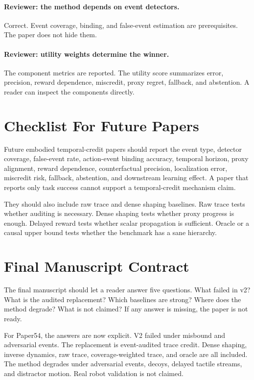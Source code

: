 \documentclass{article}
\begin{document}
\paragraph{Reviewer: the method depends on event detectors.}
Correct. Event coverage, binding, and false-event estimation are prerequisites. The paper does not hide them.

\paragraph{Reviewer: utility weights determine the winner.}
The component metrics are reported. The utility score summarizes error, precision, reward dependence, miscredit, proxy regret, fallback, and abstention. A reader can inspect the components directly.

\section{Checklist For Future Papers}

Future embodied temporal-credit papers should report the event type, detector coverage, false-event rate, action-event binding accuracy, temporal horizon, proxy alignment, reward dependence, counterfactual precision, localization error, miscredit risk, fallback, abstention, and downstream learning effect. A paper that reports only task success cannot support a temporal-credit mechanism claim.

They should also include raw trace and dense shaping baselines. Raw trace tests whether auditing is necessary. Dense shaping tests whether proxy progress is enough. Delayed reward tests whether scalar propagation is sufficient. Oracle or a causal upper bound tests whether the benchmark has a sane hierarchy.

\section{Final Manuscript Contract}

The final manuscript should let a reader answer five questions. What failed in v2? What is the audited replacement? Which baselines are strong? Where does the method degrade? What is not claimed? If any answer is missing, the paper is not ready.

For Paper54, the answers are now explicit. V2 failed under misbound and adversarial events. The replacement is event-audited trace credit. Dense shaping, inverse dynamics, raw trace, coverage-weighted trace, and oracle are all included. The method degrades under adversarial events, decoys, delayed tactile streams, and distractor motion. Real robot validation is not claimed.
\end{document}
